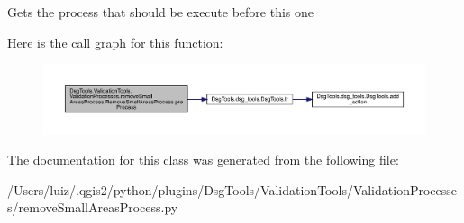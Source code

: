 \begin{DoxyVerb}Gets the process that should be execute before this one
\end{DoxyVerb}
 Here is the call graph for this function\+:
\nopagebreak
\begin{figure}[H]
\begin{center}
\leavevmode
\includegraphics[width=350pt]{class_dsg_tools_1_1_validation_tools_1_1_validation_processes_1_1remove_small_areas_process_1_1_remove_small_areas_process_a9097ae68e0988781aca0071460160568_cgraph}
\end{center}
\end{figure}


The documentation for this class was generated from the following file\+:\begin{DoxyCompactItemize}
\item 
/\+Users/luiz/.\+qgis2/python/plugins/\+Dsg\+Tools/\+Validation\+Tools/\+Validation\+Processes/remove\+Small\+Areas\+Process.\+py\end{DoxyCompactItemize}
